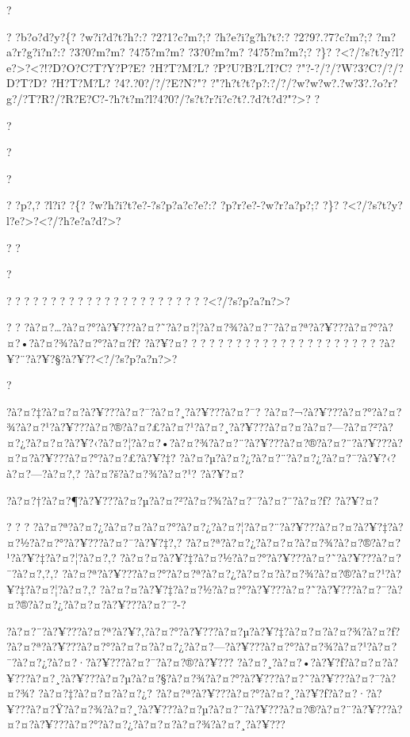 \documentclass[11pt, openany]{book}
\begin{document}
{{{{{{{{{{{{{{{{?

? ?b?o?d?y?\{? ?w?i?d?t?h?:? ?2?1?c?m?;? ?h?e?i?g?h?t?:? ?2?9?.?7?c?m?;?
?m?a?r?g?i?n?:? ?3?0?m?m? ?4?5?m?m? ?3?0?m?m? ?4?5?m?m?;? ?\}?
?\textless{}?/?s?t?y?l?e?\textgreater{}?\textless{}?!?D?O?C?T?Y?P?E?
?H?T?M?L? ?P?U?B?L?I?C? ?"?-?/?/?W?3?C?/?/?D?T?D? ?H?T?M?L?
?4?.?0?/?/?E?N?"?
?"?h?t?t?p?:?/?/?w?w?w?.?w?3?.?o?r?g?/?T?R?/?R?E?C?-?h?t?m?l?4?0?/?s?t?r?i?c?t?.?d?t?d?"?\textgreater{}?
?

?

?

?

? ?p?,? ?l?i? ?\{? ?w?h?i?t?e?-?s?p?a?c?e?:? ?p?r?e?-?w?r?a?p?;? ?\}?
?\textless{}?/?s?t?y?l?e?\textgreater{}?\textless{}?/?h?e?a?d?\textgreater{}?

? ?

?

? ? ? ? ? ? ? ? ? ? ? ? ? ? ? ? ? ? ? ? ? ?
?\textless{}?/?s?p?a?n?\textgreater{}?

? ?
?à?¤?\ldots{}?à?¤?°?à?¥???à?¤?˜?à?¤?¦?à?¤?¾?à?¤?¨?à?¤?ª?à?¥???à?¤?°?à?¤?•?à?¤?¾?à?¤?°?à?¤?ƒ?
?à?¥?¤? ? ? ? ? ? ? ? ? ? ? ? ? ? ? ? ? ? ? ? ? ?
?à?¥?¨?à?¥?§?à?¥?­?\textless{}?/?s?p?a?n?\textgreater{}?

?

?à?¤?‡?à?¤?¤?à?¥???à?¤?¯?à?¤?¸?à?¥???à?¤?¯?
?à?¤?¬?à?¥???à?¤?°?à?¤?¾?à?¤?¹?à?¥???à?¤?®?à?¤?£?à?¤?¹?à?¤?¸?à?¥???à?¤?¤?à?¤?---?à?¤?²?à?¤?¿?à?¤?¤?à?¥?‹?à?¤?¦?à?¤?•?à?¤?¾?à?¤?¨?à?¥???à?¤?®?à?¤?¨?à?¥???à?¤?¤?à?¥???à?¤?°?à?¤?£?à?¥?‡?
?à?¤?µ?à?¤?¿?à?¤?¨?à?¤?¿?à?¤?¯?à?¥?‹?à?¤?---?à?¤?‚? ?à?¤?š?à?¤?¾?à?¤?¹?
?à?¥?¤?

?à?¤?†?à?¤?¶?à?¥???à?¤?µ?à?¤?²?à?¤?¾?à?¤?¯?à?¤?¨?à?¤?ƒ? ?à?¥?¤?

? ? ?
?à?¤?ª?à?¤?¿?à?¤?¤?à?¤?°?à?¤?¿?à?¤?¦?à?¤?¨?à?¥???à?¤?¤?à?¥?‡?à?¤?½?à?¤?°?à?¥???à?¤?¯?à?¥?‡?,?
?à?¤?ª?à?¤?¿?à?¤?¤?à?¤?¾?à?¤?®?à?¤?¹?à?¥?‡?à?¤?¦?à?¤?‚?
?à?¤?¤?à?¥?‡?à?¤?½?à?¤?°?à?¥???à?¤?˜?à?¥???à?¤?¯?à?¤?‚?,?
?à?¤?ª?à?¥???à?¤?°?à?¤?ª?à?¤?¿?à?¤?¤?à?¤?¾?à?¤?®?à?¤?¹?à?¥?‡?à?¤?¦?à?¤?‚?
?à?¤?¤?à?¥?‡?à?¤?½?à?¤?°?à?¥???à?¤?˜?à?¥???à?¤?¯?à?¤?®?à?¤?¿?à?¤?¤?à?¥???à?¤?¯?-?

?à?¤?¨?à?¥???à?¤?ª?à?¥?‚?à?¤?°?à?¥???à?¤?µ?à?¥?‡?à?¤?¤?à?¤?¾?à?¤?ƒ?
?à?¤?ª?à?¥???à?¤?°?à?¤?¤?à?¤?¿?à?¤?---?à?¥???à?¤?°?à?¤?¾?à?¤?¹?à?¤?¯?à?¤?¿?à?¤?·?à?¥???à?¤?¯?à?¤?®?à?¥???
?à?¤?¸?à?¤?•?à?¥?ƒ?à?¤?¤?à?¥???à?¤?¸?à?¥???à?¤?µ?à?¤?§?à?¤?¾?à?¤?°?à?¥???à?¤?˜?à?¥???à?¤?¯?à?¤?¾?
?à?¤?‡?à?¤?¤?à?¤?¿?
?à?¤?ª?à?¥???à?¤?°?à?¤?¸?à?¥?ƒ?à?¤?·?à?¥???à?¤?Ÿ?à?¤?¾?à?¤?¸?à?¥???à?¤?µ?à?¤?¨?à?¥???à?¤?®?à?¤?¨?à?¥???à?¤?¤?à?¥???à?¤?°?à?¤?¿?à?¤?¤?à?¤?¾?à?¤?¸?à?¥???

}}}}}}}}}}}}}}}}
\end{document}
